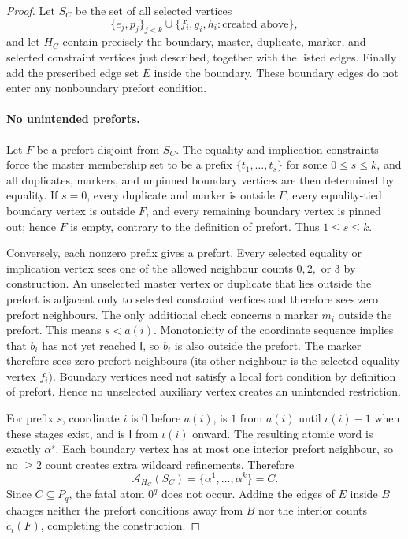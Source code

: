 \documentclass[11pt,reqno]{amsart}
\theoremstyle{definition}
\begin{document}
\begin{proof}
Let $S_C$ be the set of all selected vertices
\[
 \{e_j,p_j\}_{j<k}\cup\{f_i,g_i,h_i:\text{created above}\},
\]
and let $H_C$ contain precisely the boundary, master, duplicate, marker, and
selected constraint vertices just described, together with the listed edges.
Finally add the prescribed edge set $E$ inside the boundary.  These boundary
edges do not enter any nonboundary prefort condition.

\paragraph{No unintended preforts.}
Let $F$ be a prefort disjoint from $S_C$.  The equality and implication
constraints force the master membership set to be a prefix
$\{t_1,\ldots,t_s\}$ for some $0\le s\le k$, and all duplicates, markers, and
unpinned boundary vertices are then determined by equality.  If $s=0$, every
duplicate and marker is outside $F$, every equality-tied boundary vertex is
outside $F$, and every remaining boundary vertex is pinned out; hence $F$ is
empty, contrary to the definition of prefort.  Thus $1\le s\le k$.

Conversely, each nonzero prefix gives a prefort.  Every selected equality or
implication vertex sees one of the allowed neighbour counts $0,2,$ or $3$ by
construction.  An unselected master vertex or duplicate that lies outside the
prefort is adjacent only to selected constraint vertices and therefore sees
zero prefort neighbours.  The only additional check concerns a marker $m_i$
outside the prefort.  This means $s<a(i)$.  Monotonicity of the coordinate
sequence implies that $b_i$ has not yet reached $\mathsf I$, so $b_i$ is also
outside the prefort.  The marker therefore sees zero prefort neighbours (its
other neighbour is the selected equality vertex $f_i$).  Boundary vertices
need not satisfy a local fort condition by definition of prefort.  Hence no
unselected auxiliary vertex creates an unintended restriction.

For prefix $s$, coordinate $i$ is $0$ before $a(i)$, is $1$ from $a(i)$ until
$\iota(i)-1$ when these stages exist, and is $\mathsf I$ from $\iota(i)$
onward.  The resulting atomic word is exactly $\alpha^s$.  Each boundary
vertex has at most one interior prefort neighbour, so no $\ge2$ count creates
extra wildcard refinements.  Therefore
\[
 \mathcal A_{H_C}(S_C)=\{\alpha^1,\ldots,\alpha^k\}=C.
\]
Since $C\subseteq P_q$, the fatal atom $0^q$ does not occur.  Adding the edges
of $E$ inside $B$ changes neither the prefort conditions away from $B$ nor the
interior counts $c_i(F)$, completing the construction.
\end{proof}
\end{document}
